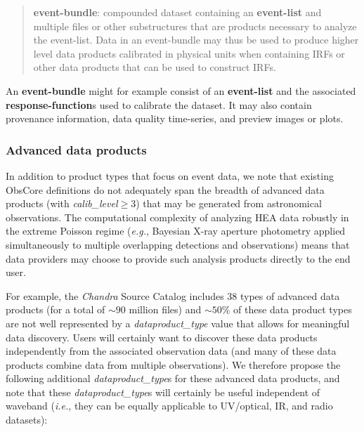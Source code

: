 \documentclass[11pt,a4paper]{ivoa}
\begin{document}
\begin{quote}
{\bf event-bundle}: compounded dataset containing an {\bf event-list} and multiple files or other substructures that are products necessary to analyze the event-list. Data in an event-bundle may thus be used to produce higher level data products calibrated in physical units when containing \glspl{IRF} or other data products that can be used to construct \glspl{IRF}.
\end{quote}

An {\bf event-bundle} might for example consist of an {\bf event-list} and the associated {\bf response-function}s used to calibrate the dataset. It may also contain provenance information, data quality time-series, and preview images or plots.

\subsubsection{Advanced data products}

In addition to product types that focus on event data, we note that existing ObsCore definitions do not adequately span the breadth of advanced data products (with {\em calib\_level\/}${}\ge 3$) that may be generated from astronomical observations. The computational complexity of analyzing \gls{HEA} data robustly in the extreme Poisson regime ({\em e.g.\/}, Bayesian X-ray aperture photometry applied simultaneously to multiple overlapping detections and observations) means that data providers may choose to provide such analysis products directly to the end user.

For example, the {\em Chandra\/} Source Catalog includes 38 types of advanced data products  (for a total of $\sim\!90$ million files) and $\sim\!50\%$ of these data product types are not well represented by a {\em dataproduct\_type} value that allows for meaningful data discovery.  Users will certainly want to discover these data products independently from the associated observation data (and many of these data products combine data from multiple observations).  We therefore propose the following additional {\em dataproduct\_type}s for these advanced data products, and note that these {\em dataproduct\_type}s will certainly be useful independent of waveband ({\em i.e.\/}, they can be equally applicable to UV/optical, IR, and radio datasets):
\end{document}
